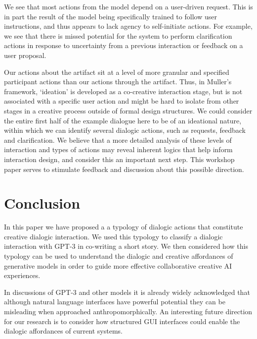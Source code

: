 \documentclass[manuscript,review]{acmart}
\begin{document}
We see that most actions from the model depend on a user-driven request. This is in part the result of the model being specifically trained to follow user instructions, and thus appears to lack agency to self-initiate actions. For example, we see that there is missed potential for the system to perform clarification actions in response to uncertainty from a previous interaction or feedback on a user proposal.

Our actions about the artifact sit at a level of more granular and specified participant actions than our actions through the artifact. Thus, in Muller's \cite{mullermixed} framework, `ideation' is developed as a co-creative interaction stage, but is not associated with a specific user action and might be hard to isolate from other stages in a creative process outside of formal design structures. We could consider the entire first half of the example dialogue here to be of an ideational nature, within which we can identify several dialogic actions, such as requests, feedback and clarification. We believe that a more detailed analysis of these levels of interaction and types of actions may reveal inherent logics that help inform interaction design, and consider this an important next step. This workshop paper serves to stimulate feedback and discussion about this possible direction.

\section{Conclusion}

In this paper we have proposed a a typology of dialogic actions that constitute creative dialogic interaction. We used this typology to classify a dialogic interaction with GPT-3 in co-writing a short story. We then considered how this typology can be used to understand the dialogic and creative affordances of generative models in order to guide more effective collaborative creative AI experiences.

In discussions of GPT-3 and other models it is already widely acknowledged that although natural language interfaces have powerful potential they can be misleading when approached anthropomorphically. An interesting future direction for our research is to consider how structured GUI interfaces could enable the dialogic affordances of current systems. 
\end{document}
